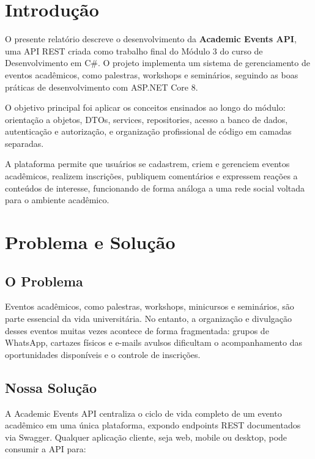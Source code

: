 \documentclass[11pt, a4paper, oneside]{article}
\begin{document}
\section{Introdução}

O presente relatório descreve o desenvolvimento da \textbf{Academic Events API}, uma API REST criada como trabalho final do Módulo 3 do curso de Desenvolvimento em C\#. O projeto implementa um sistema de gerenciamento de eventos acadêmicos, como palestras, workshops e seminários, seguindo as boas práticas de desenvolvimento com ASP.NET Core 8.

O objetivo principal foi aplicar os conceitos ensinados ao longo do módulo: orientação a objetos, DTOs, services, repositories, acesso a banco de dados, autenticação e autorização, e organização profissional de código em camadas separadas.

A plataforma permite que usuários se cadastrem, criem e gerenciem eventos acadêmicos, realizem inscrições, publiquem comentários e expressem reações a conteúdos de interesse, funcionando de forma análoga a uma rede social voltada para o ambiente acadêmico.

\section{Problema e Solução}

\subsection{O Problema}

Eventos acadêmicos, como palestras, workshops, minicursos e seminários, são parte essencial da vida universitária. No entanto, a organização e divulgação desses eventos muitas vezes acontece de forma fragmentada: grupos de WhatsApp, cartazes físicos e e-mails avulsos dificultam o acompanhamento das oportunidades disponíveis e o controle de inscrições.

\subsection{Nossa Solução}

A Academic Events API centraliza o ciclo de vida completo de um evento acadêmico em uma única plataforma, expondo endpoints REST documentados via Swagger. Qualquer aplicação cliente, seja web, mobile ou desktop, pode consumir a API para:
\end{document}
